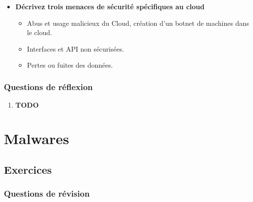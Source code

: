 \documentclass{report}
\begin{document}
\begin{itemize}
				\item \textbf{Décrivez trois menaces de sécurité spécifiques au cloud}

					\begin{itemize}
						\item Abus et usage malicieux du Cloud, création d'un botnet de machines dans le cloud.
						\item Interfaces et API non sécurisées.
						\item Pertes ou fuites des données.\\
					\end{itemize}
			\end{itemize}
			

		\subsection{Questions de réflexion}

			\begin{enumerate}
				\item \textbf{TODO}
			\end{enumerate}

\chapter{Malwares}
	
	\section{Exercices}

		\subsection{Questions de révision}
\end{document}
